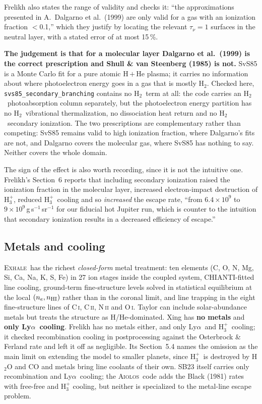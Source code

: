 \documentclass[english,a4paper]{my_memo}
\newcommand{\EXHALE}{\textsc{Exhale}}
\newcommand{\AIOLOS}{\textsc{Aiolos}}
\newcommand{\Lya}{Ly$\alpha$}
\newcommand{\Hth}{\ensuremath{\mathrm{H}_3^+}}
\newcommand{\Htwo}{\ensuremath{\mathrm{H}_2}}
\begin{document}
Frelikh also states the range of validity and checks it: ``the approximations
presented in A.\ Dalgarno et al.\ (1999) are only valid for a gas with an
ionization fraction $<$0.1,'' which they justify by locating the relevant
$\tau_\nu = 1$ surfaces in the neutral layer, with a stated error of at most
15\,\%.

\textbf{The judgement is that for a molecular layer Dalgarno et al.\ (1999) is
the correct prescription and Shull \& van Steenberg (1985) is not.} SvS85 is a
Monte Carlo fit for a pure atomic H\,$+$\,He plasma; it carries no information
about where photoelectron energy goes in a gas that is mostly \Htwo. Checked
here, \texttt{svs85\_secondary\_branching} contains no \Htwo\ term at all:
the code carries an \Htwo\ photoabsorption column separately, but the
photoelectron energy partition has no \Htwo\ vibrational thermalization, no
dissociation heat return and no \Htwo\ secondary ionization. The two
prescriptions are complementary rather than competing: SvS85 remains valid to
high ionization fraction, where Dalgarno's fits are not, and Dalgarno covers
the molecular gas, where SvS85 has nothing to say. Neither covers the whole
domain.

The sign of the effect is also worth recording, since it is not the intuitive
one. Frelikh's Section~6 reports that including secondary ionization raised
the ionization fraction in the molecular layer, increased electron-impact
destruction of \Hth, reduced \Hth\ cooling and so \emph{increased} the escape
rate, ``from $6.4\times10^9$ to $9\times10^9$\,g\,s$^{-1}$\,sr$^{-1}$ for our
fiducial hot Jupiter run, which is counter to the intuition that secondary
ionization results in a decreased efficiency of escape.''

\subsection{Metals and cooling}
\EXHALE\ has the richest \emph{closed-form} metal treatment: ten elements
(C, O, N, Mg, Si, Ca, Na, K, S, Fe) in 27 ion stages inside the coupled
system, CHIANTI-fitted line cooling, ground-term fine-structure levels solved
in statistical equilibrium at the local $(n_e, n_{\rm HI})$ rather than in the
coronal limit, and line trapping in the eight fine-structure lines of
C\,\textsc{i}, C\,\textsc{ii}, N\,\textsc{ii} and O\,\textsc{i}. Taylor can
include solar-abundance metals but treats the structure as H/He-dominated.
Xing has \textbf{no metals} and \textbf{only \Lya\ cooling}. Frelikh has no
metals either, and only \Lya\ and \Hth\ cooling; it checked recombination
cooling in postprocessing against the Osterbrock \& Ferland rate and left it
off as negligible. Its Section~5.4 names the omission as the main limit on
extending the model to smaller planets, since \Hth\ is destroyed by H$_2$O and
CO and metals bring line coolants of their own. SB23 itself
carries only recombination and \Lya\ cooling; the \AIOLOS\ code adds the Black
(1981) rates with free-free and H$_3^+$ cooling, but neither is specialized to
the metal-line escape problem.
\end{document}
